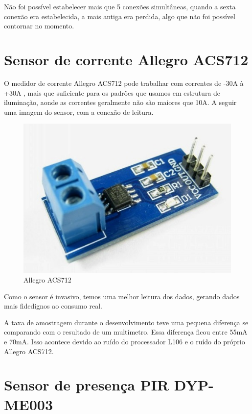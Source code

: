 \documentclass[openright]{normas-utf-tex} %
\begin{document}
Não foi possível estabelecer mais que 5 conexões simultâneas, quando a sexta conexão era estabelecida, a mais antiga era perdida, algo que não foi possível contornar no momento.

\section{Sensor de corrente Allegro ACS712}
O medidor de corrente Allegro ACS712  \cite{Allegro} pode trabalhar com correntes de -30A à +30A   \cite{Allegro} , mais que suficiente para os padrões que usamos em estrutura de iluminação, aonde as correntes geralmente não são maiores que 10A. A seguir uma imagem do sensor, com a conexão de leitura.

\begin{figure}[!htb]
     \centering
     \includegraphics[scale=0.6]{AllegroACS712.jpg}
     \caption{Allegro ACS712}
     \label{fig:AllegreoACS712}
\end{figure}

Como o sensor é invasivo, temos uma melhor leitura dos dados, gerando dados mais fidedignos ao consumo real.

A taxa de amostragem durante o desenvolvimento teve uma pequena diferença se comparando com o resultado de um multímetro. Essa diferença ficou entre 55mA e 70mA. Isso acontece devido ao ruído do processador L106 e o ruído do próprio Allegro ACS712.
 
\section{Sensor de presença PIR DYP-ME003}
\end{document}
